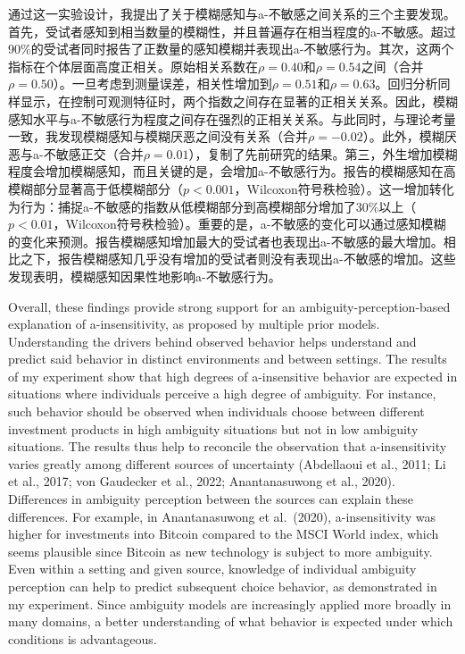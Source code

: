 \documentclass[12pt,a4paper]{article}
\newenvironment{original}
  {\par\medskip\noindent\color{black}\ignorespaces}
  {\par\medskip}
\newenvironment{translation}
  {\par\noindent\color{transblue}\ignorespaces}
  {\par\medskip\medskip}
\begin{document}
\begin{translation}
通过这一实验设计，我提出了关于模糊感知与a-不敏感之间关系的三个主要发现。首先，受试者感知到相当数量的模糊性，并且普遍存在相当程度的a-不敏感。超过90\%的受试者同时报告了正数量的感知模糊并表现出a-不敏感行为。其次，这两个指标在个体层面高度正相关。原始相关系数在$\rho = 0.40$和$\rho = 0.54$之间（合并$\rho = 0.50$）。一旦考虑到测量误差，相关性增加到$\rho = 0.51$和$\rho = 0.63$。回归分析同样显示，在控制可观测特征时，两个指数之间存在显著的正相关关系。因此，模糊感知水平与a-不敏感行为程度之间存在强烈的正相关关系。与此同时，与理论考量一致，我发现模糊感知与模糊厌恶之间没有关系（合并$\rho = -0.02$）。此外，模糊厌恶与a-不敏感正交（合并$\rho = 0.01$），复制了先前研究的结果。第三，外生增加模糊程度会增加模糊感知，而且关键的是，会增加a-不敏感行为。报告的模糊感知在高模糊部分显著高于低模糊部分（$p < 0.001$，Wilcoxon符号秩检验）。这一增加转化为行为：捕捉a-不敏感的指数从低模糊部分到高模糊部分增加了30\%以上（$p < 0.01$，Wilcoxon符号秩检验）。重要的是，a-不敏感的变化可以通过感知模糊的变化来预测。报告模糊感知增加最大的受试者也表现出a-不敏感的最大增加。相比之下，报告模糊感知几乎没有增加的受试者则没有表现出a-不敏感的增加。这些发现表明，模糊感知因果性地影响a-不敏感行为。
\end{translation}

\begin{original}
Overall, these findings provide strong support for an ambiguity-perception-based explanation of a-insensitivity, as proposed by multiple prior models. Understanding the drivers behind observed behavior helps understand and predict said behavior in distinct environments and between settings. The results of my experiment show that high degrees of a-insensitive behavior are expected in situations where individuals perceive a high degree of ambiguity. For instance, such behavior should be observed when individuals choose between different investment products in high ambiguity situations but not in low ambiguity situations. The results thus help to reconcile the observation that a-insensitivity varies greatly among different sources of uncertainty (Abdellaoui et al., 2011; Li et al., 2017; von Gaudecker et al., 2022; Anantanasuwong et al., 2020). Differences in ambiguity perception between the sources can explain these differences. For example, in Anantanasuwong et al.\ (2020), a-insensitivity was higher for investments into Bitcoin compared to the MSCI World index, which seems plausible since Bitcoin as new technology is subject to more ambiguity. Even within a setting and given source, knowledge of individual ambiguity perception can help to predict subsequent choice behavior, as demonstrated in my experiment. Since ambiguity models are increasingly applied more broadly in many domains, a better understanding of what behavior is expected under which conditions is advantageous.
\end{original}
\end{document}
